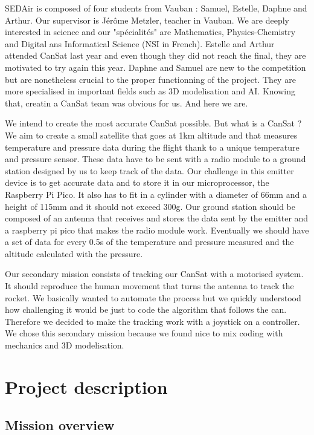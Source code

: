 \documentclass[]{article}
\begin{document}
SEDAir is composed of four students from Vauban : Samuel, Estelle, Daphne and Arthur. Our supervisor
is Jérôme Metzler, teacher in Vauban. We are deeply interested in science and our "spécialités" are
Mathematics, Physics-Chemistry and Digital ans Informatical Science (NSI in French). Estelle and Arthur
attended CanSat last year and even though they did not reach the final, they are motivated to try again 
this year. Daphne and Samuel are new to the competition but are nonetheless crucial to the proper 
functionning of the project. They are more specialised in important fields such as 3D modelisation and AI.
Knowing that, creatin a CanSat team was obvious for us. And here we are. 

We intend to create the most accurate CanSat possible. But what is a CanSat ? We aim to create a small
satellite that goes at 1km altitude and that measures temperature and pressure data during the flight 
thank to a unique temperature and pressure sensor. These data have to be sent with a radio module to a 
ground station designed by us to keep track of the data. Our challenge in this emitter device is to get 
accurate data and to store it in our microprocessor, the Raspberry Pi Pico. It also has to fit in a 
cylinder with a diameter of 66mm and a height of 115mm and it should not exceed 300g. Our ground station 
should be composed of an antenna that receives and stores the data sent by the emitter and a raspberry 
pi pico that makes the radio module work. Eventually we should have a set of data for every 0.5s of the
temperature and pressure measured and the altitude calculated with the pressure.

Our secondary mission consists of tracking our CanSat with a motorised system. It should reproduce the human
movement that turns the antenna to track the rocket. We basically wanted to automate the process but
we quickly understood how challenging it would be just to code the algorithm that follows the can. 
Therefore we decided to make the tracking work with a joystick on a controller. We chose this secondary
mission because we found nice to mix coding with mechanics and 3D modelisation. 




\section{Project description}

\subsection{Mission overview}
\end{document}
